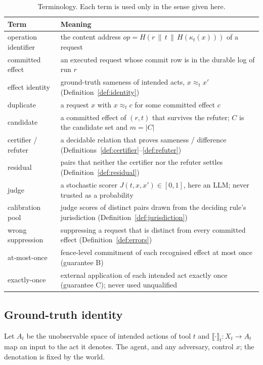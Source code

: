 \begin{table}[!tbp]
\centering\small
\caption{Terminology. Each term is used only in the sense given here.}\label{tab:terms}
\begin{tabularx}{\linewidth}{@{}p{3.8cm}X@{}}
\toprule
Term & Meaning \\
\midrule
operation identifier & the content address $\mathit{op}=H(r\,\|\,t\,\|\,H(\kappa_t(x)))$ of a request \\
committed effect & an executed request whose commit row is in the durable log of run $r$ \\
effect identity & ground-truth sameness of intended acts, $x\approx_t x'$ (Definition~\ref{def:identity}) \\
duplicate & a request $x$ with $x\approx_t c$ for some committed effect $c$ \\
candidate & a committed effect of $(r,t)$ that survives the refuter; $C$ is the candidate set and $m=|C|$ \\
certifier / refuter & a decidable relation that proves sameness / difference (Definitions~\ref{def:certifier}--\ref{def:refuter}) \\
residual & pairs that neither the certifier nor the refuter settles (Definition~\ref{def:residual}) \\
judge & a stochastic scorer $J(t,x,x')\in[0,1]$, here an LLM; never trusted as a probability \\
calibration pool & judge scores of distinct pairs drawn from the deciding rule's jurisdiction (Definition~\ref{def:jurisdiction}) \\
wrong suppression & suppressing a request that is distinct from every committed effect (Definition~\ref{def:errors}) \\
at-most-once & fence-level commitment of each recognised effect at most once (guarantee B) \\
exactly-once & external application of each intended act exactly once (guarantee C); never used unqualified \\
\bottomrule
\end{tabularx}
\end{table}

\subsection{Ground-truth identity}

Let $A_t$ be the unobservable space of intended actions of tool $t$ and $\llbracket\cdot\rrbracket_t:X_t\to A_t$ map an input to the act it denotes. The agent, and any adversary, control $x$; the denotation is fixed by the world.


